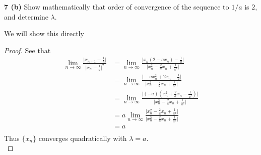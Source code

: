 \documentclass[12pt]{article}
\begin{document}
\hspace{-7 ex}\textbf{7 (b)} Show mathematically that order of convergence of the sequence to $1/a$ is $2$, and determine $\lambda$. \bigbreak

	We will show this directly \\
	\begin{proof}
		See that \\
		\begin{align*}
			\lim_{n \to \infty} \frac{\vert x_{n+1} - \frac{1}{a} \vert}{\vert x_n - \frac{1}{a} \vert^2} & = \lim_{n \to \infty} \frac{\vert x_n(2-ax_n) - \frac{1}{a} \vert }{\vert x_n^2 - \frac{2}{a}x_n + \frac{1}{a^2} \vert } \\
			& = \lim_{n \to \infty} \frac{\vert -ax_n^2 + 2x_n - \frac{1}{a} \vert }{\vert x_n^2 - \frac{2}{a}x_n + \frac{1}{a^2} \vert } \\
			& = \lim_{n \to \infty} \frac{\vert (-a)(x_n^2 + \frac{2}{a}x_n - \frac{1}{a^2} ) \vert }{\vert x_n^2 - \frac{2}{a}x_n + \frac{1}{a^2} \vert } \\
			& = a \lim_{n \to \infty} \frac{\vert x_n^2 - \frac{2}{a}x_n + \frac{1}{a^2} \vert }{\vert x_n^2 - \frac{2}{a}x_n + \frac{1}{a^2} \vert } \\
			& = a \\
		\end{align*}
		Thus $\{x_n\}$ converges quadratically with $\lambda = a$. \\
	\end{proof}
\end{document}
